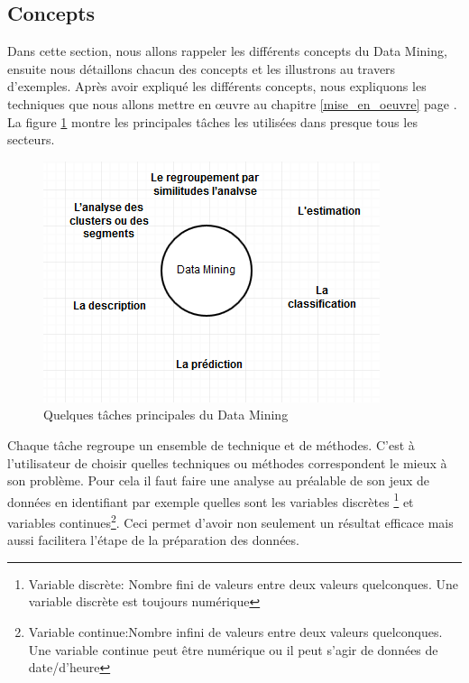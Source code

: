 \documentclass[11pt,a4paper]{report}
\begin{document}
\subsection{Concepts}
%
%
%
Dans cette section, nous allons rappeler les différents concepts du Data Mining, ensuite nous détaillons chacun des concepts et les illustrons au travers d'exemples. Après avoir expliqué les différents concepts, nous expliquons les techniques que nous allons mettre en œuvre au chapitre \ref{mise_en_oeuvre} page \pageref{mise_en_oeuvre}. La figure \ref{conceptsdm} montre les principales tâches les utilisées dans presque tous les secteurs.
\begin{figure}[h]
   \centering
   \includegraphics[scale=0.80]{application_word.PNG}
     \caption{Quelques tâches principales du Data Mining}
     \label{conceptsdm}
\end{figure}

Chaque tâche regroupe un ensemble de technique et de méthodes. C'est à l'utilisateur de choisir quelles techniques ou méthodes correspondent le mieux à son problème. Pour cela il faut faire une analyse au préalable de son jeux de données en identifiant par exemple quelles sont les variables discrètes \footnote{Variable discrète: Nombre fini de valeurs entre deux valeurs quelconques. Une variable discrète est toujours numérique} et variables continues\footnote{Variable continue:Nombre infini de valeurs entre deux valeurs quelconques. Une variable continue peut être numérique ou il peut s'agir de données de date/d'heure}. Ceci permet d'avoir non seulement un résultat efficace mais aussi facilitera l'étape de la préparation des données.
\end{document}

